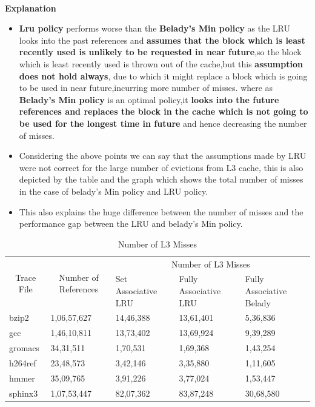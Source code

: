 \documentclass[]{article}
\begin{document}
\textbf{\\Explanation}
\begin{itemize}
 \item \textbf{Lru policy} performs worse than the \textbf{Belady's Min policy} as the LRU looks into the past references and \textbf{assumes that the block which is least recently used is unlikely to be requested in near future},so the block which is least recently used is thrown out of the cache,but this \textbf{assumption does not hold always}, due to which it might replace a block which is going to be used in near future,incurring more number of misses. where as \textbf{Belady's Min policy} is an optimal policy,it \textbf{looks into the future references and replaces the block in the cache which is not going to be used for the longest time in future} and hence decreasing the number of misses.
 \item Considering the above points we can say that the assumptions made by LRU were not correct for the large number of evictions from L3 cache, this is also depicted by the table and the graph which shows the total number of misses in the case of belady's Min policy and LRU policy.
 \item This also explains the huge difference between the number of misses and the performance gap between the LRU and belady's  Min policy.
\end{itemize}
\begin{table}[h]
\begin{tabular}{|l|l|l|l|l|}
\hline
\multicolumn{1}{|c|}{\multirow{2}{*}{Trace   File}} &
  \multicolumn{1}{c|}{\multirow{2}{*}{Number of References}} &
  \multicolumn{3}{c|}{Number of L3 Misses} \\ \cline{3-5} 
\multicolumn{1}{|c|}{} &
  \multicolumn{1}{c|}{} &
  Set   Associative LRU &
  Fully Associative LRU &
  Fully Associative Belady \\ \hline
bzip2   & 1,06,57,627 & 14,46,388 & 13,61,401 & 5,36,836  \\
gcc     & 1,46,10,811 & 13,73,402 & 13,69,924 & 9,39,289  \\
gromacs & 34,31,511   & 1,70,531  & 1,69,368  & 1,43,254  \\
h264ref & 23,48,573   & 3,42,146  & 3,35,880  & 1,11,605  \\
hmmer   & 35,09,765   & 3,91,226  & 3,77,024  & 1,53,447  \\
sphinx3 & 1,07,53,447 & 82,07,362 & 83,87,248 & 30,68,580 \\
\hline
\end{tabular}
\caption{Number of L3 Misses}
\end{table}
\end{document}
